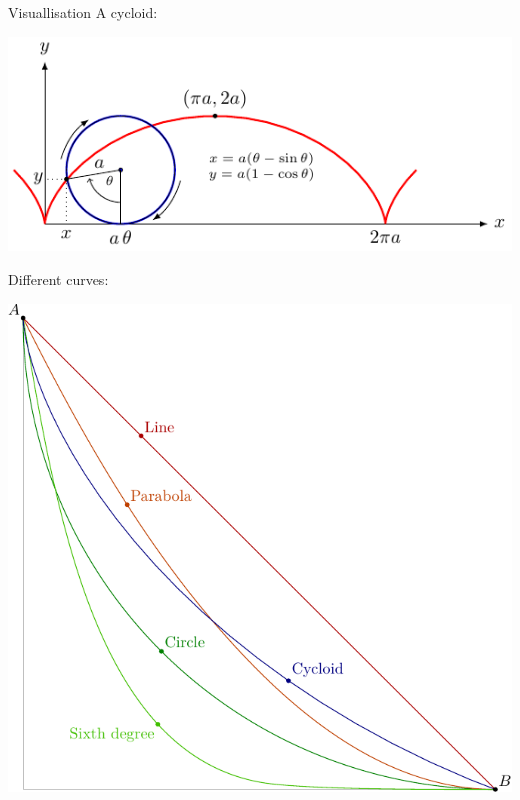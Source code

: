 \documentclass{beamer}
\begin{document}
\begin{frame}{Visuallisation}
    A cycloid: \pause

    \begin{center}
        \includegraphics[scale=1.2]{cycloid.pdf}
    \end{center}

\end{frame}

\begin{frame}
    Different curves: \pause

    \begin{center}
        \includegraphics[scale=0.75]{compareCurve.pdf}
    \end{center}
\end{frame}
\end{document}
